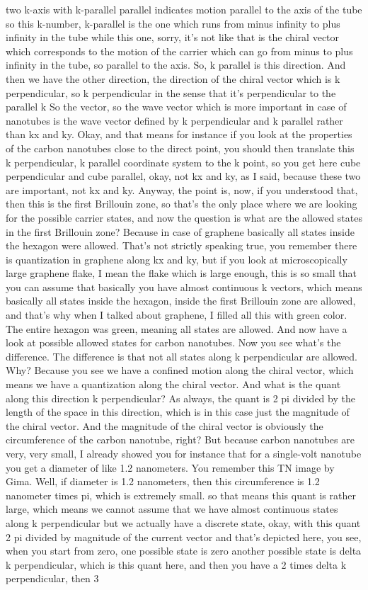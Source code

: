 two k-axis with k-parallel parallel indicates motion parallel to the axis of the tube so this k-number, k-parallel is the one which runs from minus infinity to plus infinity in the tube while this one, sorry, it's not like that is the chiral vector which corresponds to the motion of the carrier which can go from minus to plus infinity in the tube, so parallel to the axis. So, k parallel is this direction. And then we have the other direction, the direction of the chiral vector which is k perpendicular, so k perpendicular in the sense that it's perpendicular to the parallel k So the vector, so the wave vector which is more important in case of nanotubes is the wave vector defined by k perpendicular and k parallel rather than kx and ky. Okay, and that means for instance if you look at the properties of the carbon nanotubes close to the direct point, you should then translate this k perpendicular, k parallel coordinate system to the k point, so you get here cube perpendicular and cube parallel, okay, not kx and ky, as I said, because these two are important, not kx and ky. Anyway, the point is, now, if you understood that, then this is the first Brillouin zone, so that's the only place where we are looking for the possible carrier states, and now the question is what are the allowed states in the first Brillouin zone? Because in case of graphene basically all states inside the hexagon were allowed. That's not strictly speaking true, you remember there is quantization in graphene along kx and ky, but if you look at microscopically large graphene flake, I mean the flake which is large enough, this is so small that you can assume that basically you have almost continuous k vectors, which means basically all states inside the hexagon, inside the first Brillouin zone are allowed, and that's why when I talked about graphene, I filled all this with green color. The entire hexagon was green, meaning all states are allowed. And now have a look at possible allowed states for carbon nanotubes. Now you see what's the difference. The difference is that not all states along k perpendicular are allowed. Why? Because you see we have a confined motion along the chiral vector, which means we have a quantization along the chiral vector. And what is the quant along this direction k perpendicular? As always, the quant is 2 pi divided by the length of the space in this direction, which is in this case just the magnitude of the chiral vector. And the magnitude of the chiral vector is obviously the circumference of the carbon nanotube, right? But because carbon nanotubes are very, very small, I already showed you for instance that for a single-volt nanotube you get a diameter of like 1.2 nanometers. You remember this TN image by Gima. Well, if diameter is 1.2 nanometers, then this circumference is 1.2 nanometer times pi, which is extremely small. so that means this quant is rather large, which means we cannot assume that we have almost continuous states along k perpendicular but we actually have a discrete state, okay, with this quant 2 pi divided by magnitude of the current vector and that's depicted here, you see, when you start from zero, one possible state is zero another possible state is delta k perpendicular, which is this quant here, and then you have a 2 times delta k perpendicular, then 3 
